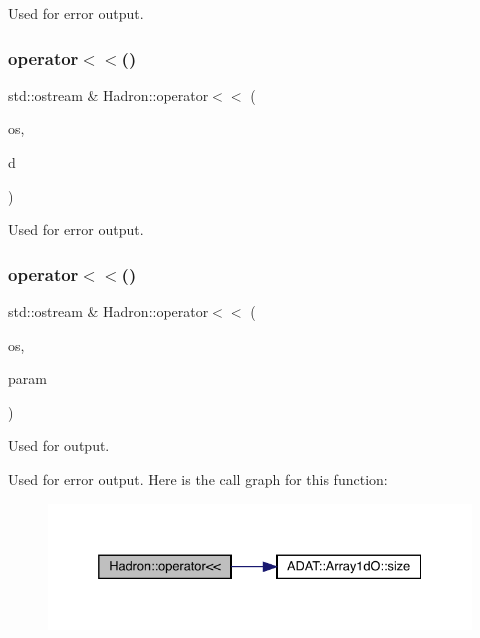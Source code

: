 Used for error output. 

\mbox{\label{namespaceHadron_a6bcf2658e0321428eeedf53a15a894aa}} 
\subsubsection{\texorpdfstring{operator$<$$<$()}{operator<<()}\hspace{0.1cm}{\footnotesize\ttfamily [23/48]}}
{\footnotesize\ttfamily std\+::ostream \& Hadron\+::operator$<$$<$ (\begin{DoxyParamCaption}\item[{std\+::ostream \&}]{os,  }\item[{const \mbox{\hyperlink{structHadron_1_1KeyGenPropElementalOperator__t}{Key\+Gen\+Prop\+Elemental\+Operator\+\_\+t}} \&}]{d }\end{DoxyParamCaption})}



Used for error output. 

\mbox{\label{namespaceHadron_a815bc759a8acf71f5194f582a963f3f7}} 
\subsubsection{\texorpdfstring{operator$<$$<$()}{operator<<()}\hspace{0.1cm}{\footnotesize\ttfamily [24/48]}}
{\footnotesize\ttfamily std\+::ostream \& Hadron\+::operator$<$$<$ (\begin{DoxyParamCaption}\item[{std\+::ostream \&}]{os,  }\item[{const \mbox{\hyperlink{classADAT_1_1Array1dO}{Array1dO}}$<$ \mbox{\hyperlink{structHadron_1_1KeyParticleOp__t}{Key\+Particle\+Op\+\_\+t}} $>$ \&}]{param }\end{DoxyParamCaption})}



Used for output. 

Used for error output. Here is the call graph for this function\+:
\nopagebreak
\begin{figure}[H]
\begin{center}
\leavevmode
\includegraphics[width=332pt]{d1/daf/namespaceHadron_a815bc759a8acf71f5194f582a963f3f7_cgraph}
\end{center}
\end{figure}
\mbox{\label{namespaceHadron_a04ae91286afb27f277e2c61cd6a77b8a}} 
